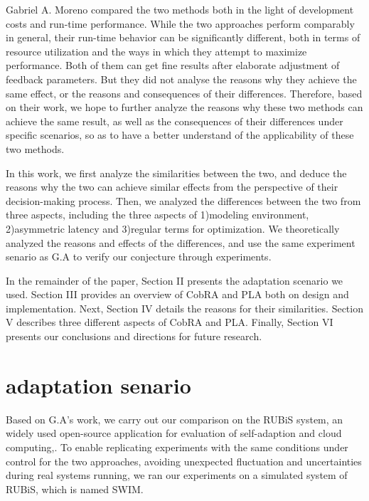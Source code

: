 \documentclass[sigconf]{acmart}
\begin{document}
Gabriel A. Moreno compared the two methods both in the light of development costs and run-time performance. While the two approaches perform comparably in general, their run-time behavior can be significantly different, both in terms of resource utilization and the ways in which they attempt to maximize performance. Both of them can get fine results after elaborate adjustment of feedback parameters. But they did not analyse the reasons why they achieve the same effect, or the reasons and consequences of their differences.
Therefore, based on their work, we hope to further analyze the reasons why these two methods can achieve the same result, as well as the consequences of their differences under specific scenarios, so as to have a better understand of the applicability of these two methods.

In this work, we first analyze the similarities between the two, and deduce the reasons why the two can achieve similar effects from the perspective of their decision-making process. Then, we analyzed the differences between the two from three aspects, including the three aspects of 1)modeling environment, 2)asymmetric latency and 3)regular terms for optimization. We theoretically analyzed the reasons and effects of the differences, and use the same experiment senario as G.A\cite{GA} to verify our conjecture through experiments.

In the remainder of the paper, Section II presents the adaptation scenario we used. Section III provides an overview of CobRA and PLA both on design and implementation. Next, Section IV details the reasons for their similarities. Section V describes three different aspects of CobRA and PLA. Finally, Section VI presents our conclusions and directions for future research.
\section{adaptation senario}

Based on G.A's work, we carry out our comparison on the RUBiS system\cite{rubis}, an widely used open-source application for evaluation of self-adaption and cloud computing\cite{rubis-1},\cite{rubis-2}. To enable replicating experiments with the same conditions under control for the two approaches, avoiding unexpected fluctuation and uncertainties during real systems running, we ran our experiments on a simulated system of RUBiS, which is named SWIM\cite{swim}.
\end{document}
